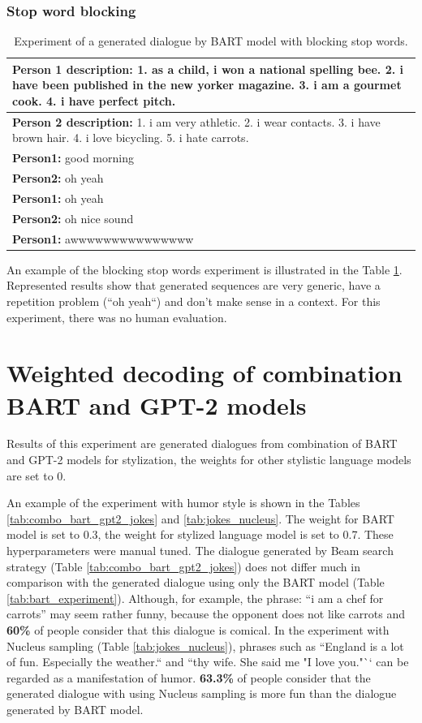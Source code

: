 \subsubsection{Stop word blocking}
\begin{table}[H]
\centering
 \begin{tabular}{|p{14cm}|} 
 \hline
 \textbf{Person 1 description:} 1. as a child, i won a national spelling bee. 2. i have been published in the new yorker magazine. 3. i am a gourmet cook. 4. i have perfect pitch. \\
 \hline
 \textbf{Person 2 description:} 1. i am very athletic. 2. i wear contacts. 3. i have brown hair. 4. i love bicycling. 5. i hate carrots. \\
 \hline
 \textbf{Person1:} good morning \\
 \textbf{Person2:} oh yeah \\
 \textbf{Person1:} oh yeah \\
 \textbf{Person2:} oh nice sound \\
 \textbf{Person1:} awwwwwwwwwwwwwww \\
 \hline
 \end{tabular}
 \caption{Experiment of a generated dialogue by BART model with blocking stop words.}
\label{tab:stop_words}
\end{table}
An example of the blocking stop words experiment is illustrated in the Table \ref{tab:stop_words}. Represented results show that generated sequences are very generic, have a repetition problem (``oh yeah``) and don't make sense in a context. For this experiment, there was no human evaluation.

\section{Weighted decoding of combination BART and GPT-2 models} \label{sec_wd}
Results of this experiment are generated dialogues from combination of BART and GPT-2 models for stylization, the weights for other stylistic language models are set to 0.

An example of the experiment with humor style is shown in the Tables \ref{tab:combo_bart_gpt2_jokes} and \ref{tab:jokes_nucleus}. The weight for BART model is set to 0.3, the weight for stylized language model is set to 0.7. These hyperparameters were manual tuned. The dialogue generated by Beam search strategy (Table \ref{tab:combo_bart_gpt2_jokes}) does not differ much in comparison with the generated dialogue using only the BART model (Table \ref{tab:bart_experiment}). Although, for example, the phrase: ``i am a chef for carrots'' may seem rather funny, because the opponent does not like carrots and \textbf{60\%} of people consider that this dialogue is comical. In the experiment with Nucleus sampling (Table \ref{tab:jokes_nucleus}), phrases such as ``England is a lot of fun. Especially the weather.`` and ``thy wife. She said me "I love you."`` can be regarded as a manifestation of humor. \textbf{63.3\%} of people consider that the generated dialogue with using Nucleus sampling is more fun than the dialogue generated by BART model.

